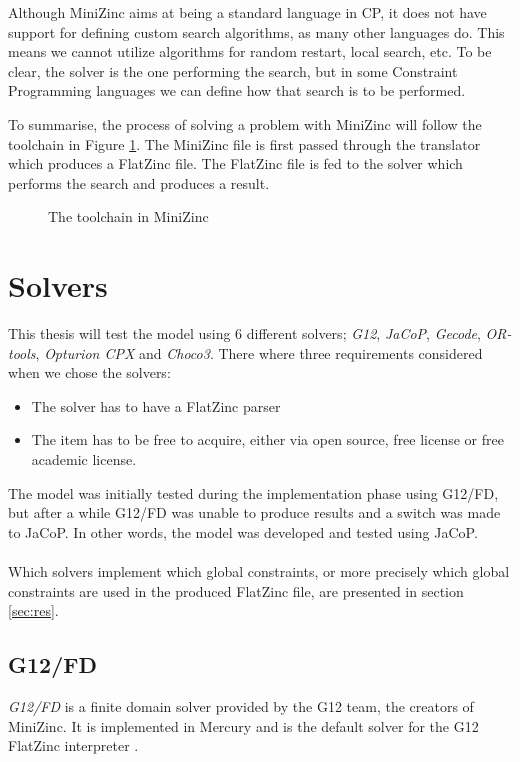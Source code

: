 Although MiniZinc aims at being a standard language in CP, it does not have support for defining custom search algorithms, as many other languages do. This means we cannot utilize algorithms for random restart, local search, etc. To be clear, the solver is the one performing the search, but in some Constraint Programming languages we can define how that search is to be performed.
\cite{mz_paper}

To summarise, the process of solving a problem with MiniZinc will follow the toolchain in Figure \ref{fig:toolchain}. The MiniZinc file is first passed through the translator which produces a FlatZinc file. The FlatZinc file is fed to the solver which performs the search and produces a result.

\begin{figure}
\centering

\caption{The toolchain in MiniZinc}
\label{fig:toolchain}
\end{figure}

\section{Solvers}
This thesis will test the model using 6 different solvers; \emph{G12}, \emph{JaCoP}, \emph{Gecode}, \emph{OR-tools}, \emph{Opturion CPX} and \emph{Choco3}. There where three requirements considered when we chose the solvers:
\begin{itemize}
\item The solver has to have a FlatZinc parser
\item The item has to be free to acquire, either via open source, free license or free academic license.
\end{itemize}

The model was initially tested during the implementation phase using G12/FD, but after a while G12/FD was unable to produce results and a switch was made to JaCoP. In other words, the model was developed and tested using JaCoP.
\\\\
Which solvers implement which global constraints, or more precisely which global constraints are used in the produced FlatZinc file, are presented in section \ref{sec:res}.

\subsection{G12/FD}
\emph{G12/FD} is a finite domain solver provided by the G12 team, the creators of MiniZinc. It is implemented in Mercury and is the default solver for the G12 FlatZinc interpreter \cite{nicta_2964} \cite{mz_result_2014}.
